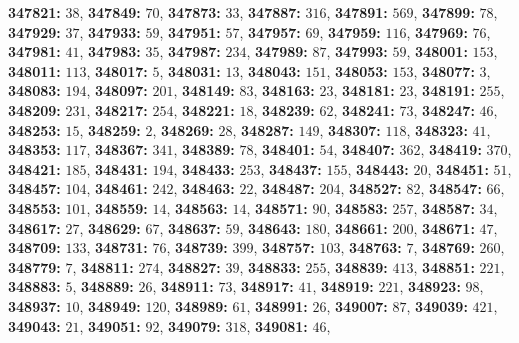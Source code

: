 \textsf{\bfseries 347821:} $38$, \textsf{\bfseries 347849:} $70$, \textsf{\bfseries 347873:} $33$, \textsf{\bfseries 347887:} $316$, \textsf{\bfseries 347891:} $569$, \textsf{\bfseries 347899:} $78$, \textsf{\bfseries 347929:} $37$, \textsf{\bfseries 347933:} $59$, \textsf{\bfseries 347951:} $57$, \textsf{\bfseries 347957:} $69$, \textsf{\bfseries 347959:} $116$, \textsf{\bfseries 347969:} $76$, \textsf{\bfseries 347981:} $41$, \textsf{\bfseries 347983:} $35$, \textsf{\bfseries 347987:} $234$, \textsf{\bfseries 347989:} $87$, \textsf{\bfseries 347993:} $59$, \textsf{\bfseries 348001:} $153$, \textsf{\bfseries 348011:} $113$, \textsf{\bfseries 348017:} $5$, \textsf{\bfseries 348031:} $13$, \textsf{\bfseries 348043:} $151$, \textsf{\bfseries 348053:} $153$, \textsf{\bfseries 348077:} $3$, \textsf{\bfseries 348083:} $194$, \textsf{\bfseries 348097:} $201$, \textsf{\bfseries 348149:} $83$, \textsf{\bfseries 348163:} $23$, \textsf{\bfseries 348181:} $23$, \textsf{\bfseries 348191:} $255$, \textsf{\bfseries 348209:} $231$, \textsf{\bfseries 348217:} $254$, \textsf{\bfseries 348221:} $18$, \textsf{\bfseries 348239:} $62$, \textsf{\bfseries 348241:} $73$, \textsf{\bfseries 348247:} $46$, \textsf{\bfseries 348253:} $15$, \textsf{\bfseries 348259:} $2$, \textsf{\bfseries 348269:} $28$, \textsf{\bfseries 348287:} $149$, \textsf{\bfseries 348307:} $118$, \textsf{\bfseries 348323:} $41$, \textsf{\bfseries 348353:} $117$, \textsf{\bfseries 348367:} $341$, \textsf{\bfseries 348389:} $78$, \textsf{\bfseries 348401:} $54$, \textsf{\bfseries 348407:} $362$, \textsf{\bfseries 348419:} $370$, \textsf{\bfseries 348421:} $185$, \textsf{\bfseries 348431:} $194$, \textsf{\bfseries 348433:} $253$, \textsf{\bfseries 348437:} $155$, \textsf{\bfseries 348443:} $20$, \textsf{\bfseries 348451:} $51$, \textsf{\bfseries 348457:} $104$, \textsf{\bfseries 348461:} $242$, \textsf{\bfseries 348463:} $22$, \textsf{\bfseries 348487:} $204$, \textsf{\bfseries 348527:} $82$, \textsf{\bfseries 348547:} $66$, \textsf{\bfseries 348553:} $101$, \textsf{\bfseries 348559:} $14$, \textsf{\bfseries 348563:} $14$, \textsf{\bfseries 348571:} $90$, \textsf{\bfseries 348583:} $257$, \textsf{\bfseries 348587:} $34$, \textsf{\bfseries 348617:} $27$, \textsf{\bfseries 348629:} $67$, \textsf{\bfseries 348637:} $59$, \textsf{\bfseries 348643:} $180$, \textsf{\bfseries 348661:} $200$, \textsf{\bfseries 348671:} $47$, \textsf{\bfseries 348709:} $133$, \textsf{\bfseries 348731:} $76$, \textsf{\bfseries 348739:} $399$, \textsf{\bfseries 348757:} $103$, \textsf{\bfseries 348763:} $7$, \textsf{\bfseries 348769:} $260$, \textsf{\bfseries 348779:} $7$, \textsf{\bfseries 348811:} $274$, \textsf{\bfseries 348827:} $39$, \textsf{\bfseries 348833:} $255$, \textsf{\bfseries 348839:} $413$, \textsf{\bfseries 348851:} $221$, \textsf{\bfseries 348883:} $5$, \textsf{\bfseries 348889:} $26$, \textsf{\bfseries 348911:} $73$, \textsf{\bfseries 348917:} $41$, \textsf{\bfseries 348919:} $221$, \textsf{\bfseries 348923:} $98$, \textsf{\bfseries 348937:} $10$, \textsf{\bfseries 348949:} $120$, \textsf{\bfseries 348989:} $61$, \textsf{\bfseries 348991:} $26$, \textsf{\bfseries 349007:} $87$, \textsf{\bfseries 349039:} $421$, \textsf{\bfseries 349043:} $21$, \textsf{\bfseries 349051:} $92$, \textsf{\bfseries 349079:} $318$, \textsf{\bfseries 349081:} $46$, 
